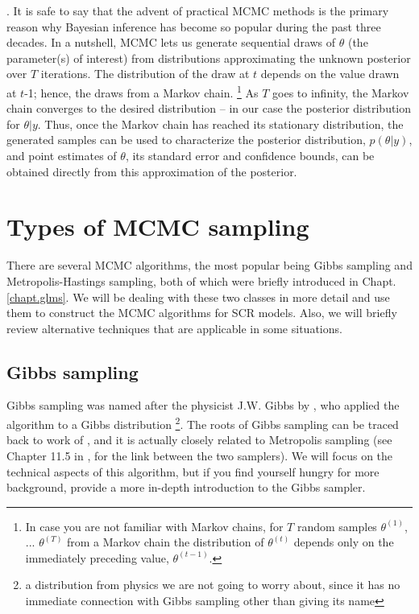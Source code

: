 \citep{gelfand_smith:1990}. It is safe to say that the advent of
practical MCMC methods is the primary reason why Bayesian inference
has become so popular during the past three decades.
In a nutshell, MCMC lets us generate sequential draws of $\theta$ (the
parameter(s) of interest) from distributions approximating the unknown
posterior over $T$ iterations. The distribution of the draw at $t$ depends
on the value drawn at $t$-1; hence, the draws from a Markov
chain. \footnote{In case you are not familiar with Markov chains, for
  $T$ random samples $\theta^ {(1)}$, ... $\theta^{(T)}$ from a Markov chain
  the distribution of $\theta^{(t)}$ depends only on the immediately preceding
  value, $\theta^{(t-1)}$.} As $T$ goes to infinity, the Markov chain
converges to the desired distribution – in our case the posterior
distribution for $\theta|y$. Thus, once the Markov chain has reached
its stationary distribution, the generated samples can be used to
characterize the posterior distribution, $p(\theta|y)$, and point
estimates of $\theta$, its standard error and confidence bounds, can
be obtained directly from this approximation of the posterior. 



\section{Types of MCMC sampling}

There are several MCMC algorithms, the most popular being Gibbs
sampling and Metropolis-Hastings sampling, both of which were briefly introduced in Chapt. \ref{chapt.glms}. We will be dealing with
these two classes in more detail and use them to construct the MCMC
algorithms for SCR models. Also, we will briefly review alternative
techniques that are applicable in some situations.


\subsection{Gibbs sampling}

Gibbs sampling was named after the physicist J.W. Gibbs by
\citet{geman_geman:1984}, who applied the algorithm to a Gibbs
distribution \footnote{a distribution from physics we are not going to
  worry about, since it has no immediate connection with Gibbs
  sampling other than giving its name}. The roots of Gibbs sampling
can be traced back to work of \citet{metropolis_ulam:1953}, and it is
actually closely related to Metropolis sampling (see Chapter 11.5 in
\citet{gelman_etal:2004}, for the link between the two samplers). We
will focus on the technical aspects of this algorithm, but if you find
yourself hungry for more background, \citet{casella_george:1992}
provide a more in-depth introduction to the Gibbs sampler.

